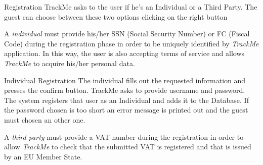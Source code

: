 \documentclass[a4paper]{article}
\begin{document}
        \begin{usecase}{ Registration}
              {TrackMe asks to the user if he's an Individual or a Third Party. The guest can choose between these two options clicking on the right button}
        \end{usecase}
        
        A  \textit{individual} must provide his/her SSN (Social Security Number) or FC (Fiscal Code) during the registration phase in order to be uniquely identified by \textit{TrackMe} application. In this way, the user is also accepting terms of service and allows \textit{TrackMe} to acquire his/her personal data.
        \begin{usecase}{Individual  Registration}
              {The individual fills out the requested information and presses the confirm button.}
               {TrackMe asks to provide username and password.}
              {The system registers that user as an Individual and adds it to the  Database.}
        {If the password chosen is too short an error message is printed out and the guest must chosen an other one.}
      \end{usecase}
        
        
        A \textit{third-party} must provide a VAT number during the registration in order to allow \textit{TrackMe} to check that the submitted VAT is registered and that is issued by an EU Member State.
        
\end{document}
